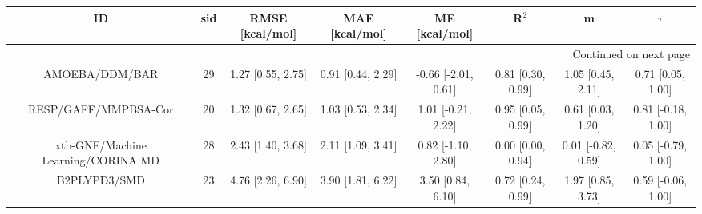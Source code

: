 \documentclass[8pt]{article}
\begin{document}
\begin{center}
\begin{footnotesize}
\begin{longtable}{|cccccccc|}
\toprule
                                 ID & sid &    RMSE [kcal/mol] &     MAE [kcal/mol] &        ME [kcal/mol] &              R$^2$ &                   m &              $\tau$ \\
\midrule
\endhead
\midrule
\multicolumn{8}{r}{{Continued on next page}} \\
\midrule
\endfoot

\bottomrule
\endlastfoot
                     AMOEBA/DDM/BAR &  29 &  1.27 [0.55, 2.75] &  0.91 [0.44, 2.29] &  -0.66 [-2.01, 0.61] &  0.81 [0.30, 0.99] &   1.05 [0.45, 2.11] &   0.71 [0.05, 1.00] \\
               RESP/GAFF/MMPBSA-Cor &  20 &  1.32 [0.67, 2.65] &  1.03 [0.53, 2.34] &   1.01 [-0.21, 2.22] &  0.95 [0.05, 0.99] &   0.61 [0.03, 1.20] &  0.81 [-0.18, 1.00] \\
 xtb-GNF/Machine Learning/CORINA MD &  28 &  2.43 [1.40, 3.68] &  2.11 [1.09, 3.41] &   0.82 [-1.10, 2.80] &  0.00 [0.00, 0.94] &  0.01 [-0.82, 0.59] &  0.05 [-0.79, 1.00] \\
                       B2PLYPD3/SMD &  23 &  4.76 [2.26, 6.90] &  3.90 [1.81, 6.22] &    3.50 [0.84, 6.10] &  0.72 [0.24, 0.99] &   1.97 [0.85, 3.73] &  0.59 [-0.06, 1.00] \\
\end{longtable}
\end{footnotesize}
\end{center}
\end{document}

